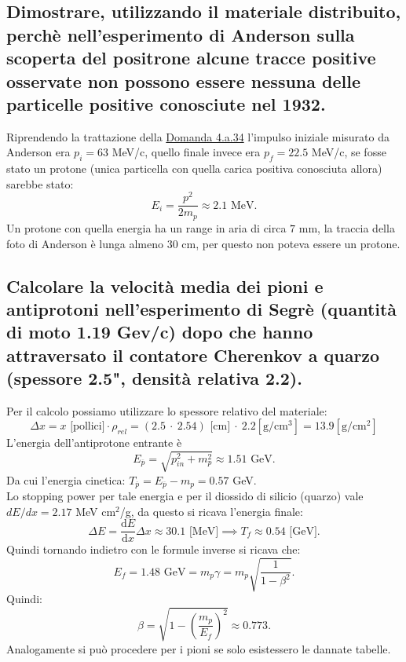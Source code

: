 \subsection[\hspace{1mm} Confutazione dell'ipotesi di protone nell'esperimento di Anderson]{Dimostrare, utilizzando il materiale distribuito, perchè nell’esperimento di Anderson sulla scoperta del positrone alcune tracce positive osservate non
possono essere nessuna delle particelle positive conosciute nel 1932.
}
\label{sec:4.b.25}
Riprendendo la trattazione della \hyperref[sec:4.a.34]{Domanda 4.a.34} l'impulso iniziale misurato da Anderson era $p_{i}= 63$ MeV/c, quello finale invece era $p_{f}=22.5$ MeV/c, se fosse stato un protone (unica particella con quella carica positiva conosciuta allora) sarebbe stato:
\[
	E_{i}= \frac{p^2}{2m_{p}}\approx 2.1 \text{ MeV}
.\] 
Un protone con quella energia ha un range in aria di circa $7$ mm, la traccia della foto di Anderson è lunga almeno $30$ cm, per questo non poteva essere un protone.


\subsection[\hspace{1mm} Considerazioni sulla velocità delle particelle nell'esperimento di Segrè]{Calcolare la velocità media dei pioni e antiprotoni nell'esperimento di Segrè (quantità di moto 1.19 Gev/c) dopo che hanno attraversato il contatore Cherenkov a quarzo (spessore 2.5", densità relativa 2.2).
}
\label{sec:4.b.26}
Per il calcolo possiamo utilizzare lo spessore relativo del materiale: 
\[
	\Delta x = x \text{ [pollici]}\cdot \rho_{rel}= (2.5 \ \cdot \ 2.54) \text{ [cm]} \ \cdot \ 2.2 \left[\text{g}/\text{cm}^3 \right] = 13.9\left[\text{g}/\text{cm}^2 \right]
\]
L'energia dell'antiprotone entrante è 
\[
	E_{\overline{p}} = \sqrt{ p_{in}^2+m_{p}^2} \approx 1.51 \text{ GeV}
.\] 
Da cui l'energia cinetica: $T_{\overline{p}}= E_{\overline{p}}-m_{p}= 0.57$ GeV.\\
Lo stopping power per tale energia e per il diossido di silicio (quarzo) vale $dE /dx = 2.17$ MeV cm$^2$/g, da questo si ricava l'energia finale:
\[
	\Delta E = \frac{\mbox{d} E}{\mbox{d} x} \Delta x \approx 30.1 \text{ [MeV]} \implies T_{f} \approx 0.54 \text{ [GeV]}
.\] 
Quindi tornando indietro con le formule inverse si ricava che:
\[
	E_{f} = 1.48 \text{ GeV} = m_{p}\gamma = m_{p}\sqrt{\frac{1}{1-\beta^2}} 
.\] 
Quindi:
\[
	\beta = \sqrt{1 - \left( \frac{m_{p}}{E_{f}} \right)^2} \approx 0.773 
.\] 
Analogamente si può procedere per i pioni se solo esistessero le dannate tabelle.



